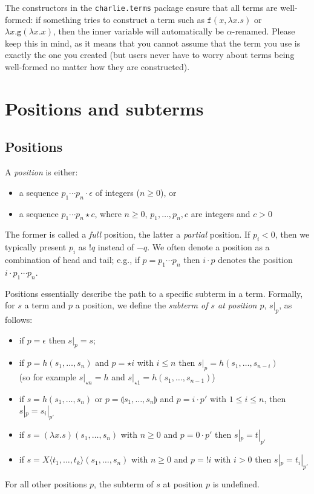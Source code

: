 \documentclass{lmcs}
\theoremstyle{theorem}\newtheorem{theorem}{Theorem}
\theoremstyle{theorem}\newtheorem{lemma}[theorem]{Lemma}
\theoremstyle{theorem}\newtheorem{corollary}[theorem]{Corollary}
\theoremstyle{definition}\newtheorem{definition}[theorem]{Definition}
\theoremstyle{definition}\newtheorem{example}[theorem]{Example}
\newcommand{\identifier}[1]{\mathtt{#1}}
\newcommand{\afun}{\identifier{f}}
\newcommand{\bfun}{\identifier{g}}
\newcommand{\avar}{x}
\newcommand{\Avar}{X}
\newcommand{\abs}[2]{\lambda #1.#2}
\newcommand{\meta}[2]{#1\langle#2\rangle}
\newcommand{\tuple}[2]{\llparenthesis #1,\dots,#2 \rrparenthesis}
\begin{document}
The constructors in the \texttt{charlie.terms} package ensure that all terms
are well-formed: if something tries to construct a term such as $\afun(\avar,
\abs{\avar}{s})$ or $\abs{\avar}{\bfun(\abs{\avar}{\avar})}$, then the inner
variable will automatically be $\alpha$-renamed.  Please keep this in mind, as
it means that you cannot assume that the term you use is exactly the one you
created (but users never have to worry about terms being well-formed no matter
how they are constructed).

\section{Positions and subterms}

\subsection{Positions}

A \emph{position} is either:
\begin{itemize}
\item a sequence $p_1 \cdots p_n \cdot \epsilon$ of integers ($n \geq 0$), or
\item a sequence $p_1 \cdots p_n \star c$, where $n \geq 0$, $p_1,\dots,p_n,c$
  are integers and $c > 0$
\end{itemize}
The former is called a \emph{full} position, the latter a \emph{partial}
position.  If $p_i < 0$, then we typically present $p_i$ as $!q$ instead of
$-q$.  We often denote a position as a combination of head and tail; e.g.,
if $p = p_1 \cdots p_n$ then $i \cdot p$ denotes the position
$i \cdot p_1 \cdots p_n$.

Positions essentially describe the path to a specific subterm in a term.
Formally, for $s$ a term and $p$ a position, we define the \emph{subterm of $s$
at position $p$}, $s|_p$, as follows:
\begin{itemize}
\item if $p = \epsilon$ then $s|_p = s$;
\item if $p = h(s_1,\dots,s_n)$ and $p = \star i$ with $i \leq n$ then
  $s|_p = h(s_1,\dots,s_{n-i})$ \\
    (so for example $s|_{\star n} = h$ and $s|_{\star 1} =
    h(s_1,\dots,s_{n-1})$)
\item if $s = h(s_1,\dots,s_n)$ or $p = \tuple{s_1}{s_n}$ and $p = i \cdot p'$
  with $1 \leq i \leq n$, then $s|_p = s_i|_{p'}$
\item if $s = (\abs{\avar}{s})(s_1,\dots,s_n)$ with $n \geq 0$ and $p = 0 \cdot
  p'$ then $s|_p = t|_{p'}$
\item if $s = \meta{\Avar}{t_1,\dots,t_k}(s_1,\dots,s_n)$ with $n \geq 0$ and
  $p = !i$ with $i > 0$ then $s|_p = t_i|_{p'}$
\end{itemize}
For all other positions $p$, the subterm of $s$ at position $p$ is undefined.
\end{document}
